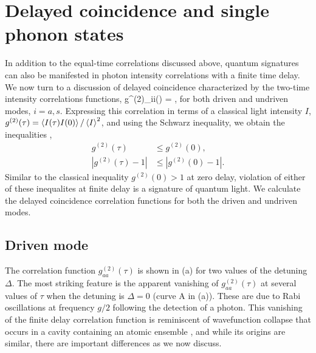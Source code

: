 \section{Delayed coincidence and single phonon states}
\label{sect:Delayed_coincidence}


In addition to the equal-time correlations discussed above,
quantum signatures can also be manifested in photon
intensity correlations with a finite time delay.
We now turn to a discussion of  delayed coincidence
characterized by the 
two-time
intensity correlations functions,
\bel
\label{eq:g2_tau}
	g^{(2)}_{ii}(\tau) = ,
\eel
for both driven and undriven modes, $i = a,s$.
Expressing this correlation in terms of a classical
light intensity $I$,
$g^{(2)}(\tau) = \left<  I(\tau) I(0)  \right> / \left<  I  \right>^2$,
and
using the Schwarz inequality, we
obtain the inequalities \cite{Carmichael1991, Brecha1999},
\begin{align}
  \label{eq:classical_criterium}
 	g^{(2)}(\tau) &\leq g^{(2)}(0),	%
	\\
	 |g^{(2)}(\tau)-1| & \leq |g^{(2)}(0)-1| .%
\end{align}
Similar to the classical inequality
$g^{(2)}(0) > 1$ at zero delay, 
violation of either of these inequalites
at finite delay is
a signature of quantum light. 
We calculate the delayed coincidence correlation
functions
for both the driven and undriven modes.


\subsection{Driven mode}
The
correlation function $g^{(2)}_{aa}(\tau)$ is shown in (a)
for two values of the detuning $\Delta$.
The most striking feature
is the apparent vanishing of  $g^{(2)}_{aa}(\tau)$
at several values of $\tau$ when the
detuning is $\Delta = 0$ (curve A in (a)).
These are due to Rabi oscillations at frequency
$g/2$ following the detection of a photon.
This vanishing of the finite delay correlation function
is reminiscent of  wavefunction collapse that
occurs in a cavity containing an 
atomic ensemble \cite{Carmichael1991},
and while its origins are similar, there are important
differences as we now discuss.




